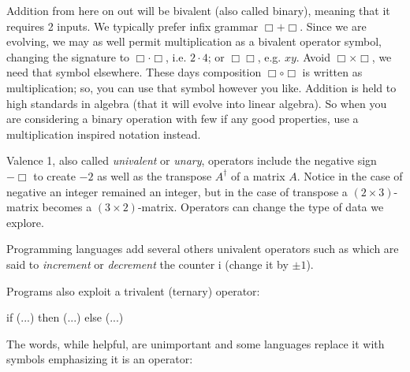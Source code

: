Addition from here on out will be bivalent (also called binary), meaning 
that it requires 2 inputs.  We typically prefer infix grammar $\Box +\Box$.
Since we are evolving, we may as well permit multiplication as a bivalent operator
symbol, changing the signature to $\Box \cdot \Box$, i.e. $2\cdot 4$; or
$\Box\Box$, e.g. $xy$.   Avoid $\Box\times \Box$, we need that symbol elsewhere.
These days composition $\Box\circ\Box$ is written as multiplication; so, you can
use that symbol however you like.  Addition is held to high standards in algebra
(that it will evolve into linear algebra).  So when you are considering a binary
operation with few if any good properties, use a multiplication inspired
notation instead.   




 Valence
1, also called \emph{univalent} or \emph{unary}, operators include the negative
sign $-\Box$ to create $-2$ as well as the transpose $A^{\dagger}$ of a matrix
$A$. Notice in the case of negative an integer remained an integer, but in the
case of transpose a $(2\times 3)$-matrix becomes a $(3\times 2)$-matrix.
Operators can change the type of data we explore.
 
Programming languages add several others univalent operators
such as  which are said to \emph{increment} 
or \emph{decrement} the counter i (change it by $\pm 1$).

Programs also exploit a trivalent (ternary) operator:
\begin{center}
\begin{Pcode}[]
if (...) then (...) else (...)
\end{Pcode}
\end{center}
The words, while helpful, are unimportant and some languages
replace it with symbols emphasizing it is an operator:
\begin{center}
\end{center}

